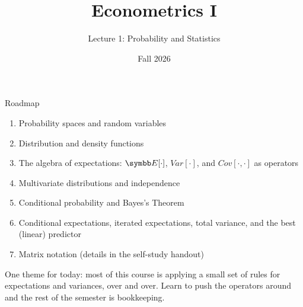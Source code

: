 \documentclass[aspectratio=169,11pt]{beamer}
\begin{document}

\title{Econometrics I}
\subtitle{Lecture 1: Probability and Statistics}

\date{Fall 2026}
\maketitle


\begin{frame}{Roadmap}
\begin{enumerate}
	\item Probability spaces and random variables
	\item Distribution and density functions
	\item \alert{The algebra of expectations}: $\E[\cdot]$, $Var[\cdot]$, and $Cov[\cdot,\cdot]$ as operators
	\item Multivariate distributions and independence
	\item Conditional probability and Bayes's Theorem
	\item Conditional expectations, iterated expectations, total variance, and the best (linear) predictor
	\item Matrix notation (details in the self-study handout)
\end{enumerate}
\bigskip
One theme for today: most of this course is \alert{applying a small set of rules}
for expectations and variances, over and over. Learn to push the operators around
and the rest of the semester is bookkeeping.
\end{frame}
\end{document}
